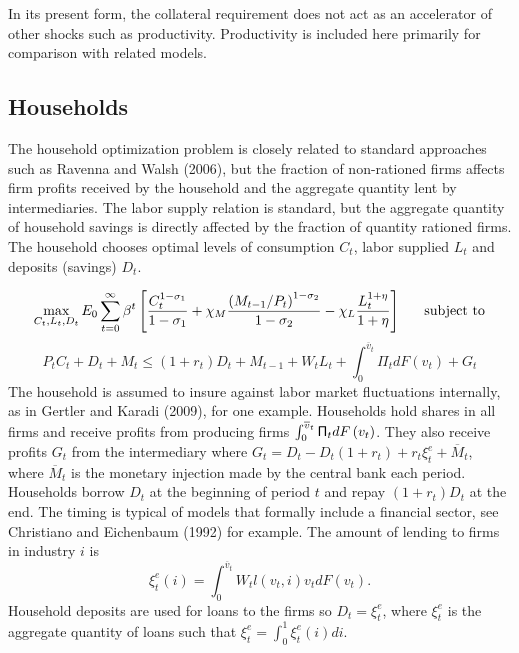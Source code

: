 \documentclass{article}
\begin{document}
In its present form, the collateral requirement does not act as an
accelerator of other shocks such as productivity. Productivity is included
here primarily for comparison with related models.

\subsection{Households}

The household optimization problem is closely related to standard approaches
such as Ravenna and Walsh (2006), but the fraction of non-rationed firms
affects firm profits received by the household and the aggregate quantity
lent by intermediaries. The labor supply relation is standard, but the
aggregate quantity of household savings is directly affected by the fraction
of quantity rationed firms. The household chooses optimal levels of
consumption $C_{t}$, labor supplied $L_{t}$ and deposits (savings) $D_{t}$.

\begin{equation}
\max_{C_{t},L_{t},D_{t}}E_{0}\sum\limits_{t=0}^{\infty }\beta ^{t}\left[
\frac{C_{t}^{1-\sigma _{1}}}{1-\sigma _{1}}+\chi _{M}\frac{\left(
M_{t-1}/P_{t}\right) ^{1-\sigma _{2}}}{1-\sigma _{2}}-\chi _{L}\frac{%
L_{t}^{1+\eta }}{1+\eta }\right] \text{ \ \ \ \ subject to}  \label{HH}
\end{equation}
\begin{equation*}
P_{t}C_{t}+D_{t}+M_{t}\leq \left( 1+r_{t}\right)
D_{t}+M_{t-1}+W_{t}L_{t}+\int_{0}^{\overline{v}_{t}}\mathsf{\Pi }%
_{t}dF\left( v_{t}\right) +G_{t}
\end{equation*}
The household is assumed to insure against labor market fluctuations
internally, as in Gertler and Karadi (2009), for one example. Households
hold shares in all firms and receive profits from producing firms $\int_{0}^{%
\overline{v}_{t}}\mathsf{\Pi }_{t}dF\left( v_{t}\right)$. They also
receive profits $G_{t}$ from the intermediary where $G_{t}=D_{t}-D_{t}\left(
1+r_{t}\right) +r_{t}\xi _{t}^{e}+\overline{M}_{t}$, where $\overline{M}_{t}$
is the monetary injection made by the central bank each period. Households
borrow $D_{t}$ at the beginning of period $t$ and repay $\left(
1+r_{t}\right) D_{t}$ at the end. The timing is typical of models that
formally include a financial sector, see Christiano and Eichenbaum (1992)
for example. The amount of lending to firms in industry $i$ is
\begin{equation}
\xi _{t}^{e}\left( i\right) =\int_{0}^{\overline{v}_{t}}W_{t}l\left(
v_{t},i\right) v_{t}dF\left( v_{t}\right) .  \label{agg lending}
\end{equation}
Household deposits are used for loans to the firms so $D_{t}=\xi _{t}^{e}$,
where $\xi _{t}^{e}$ is the aggregate quantity of loans such that $\xi
_{t}^{e}=\int_{0}^{1}\xi _{t}^{e}\left( i\right) di$.
\end{document}
